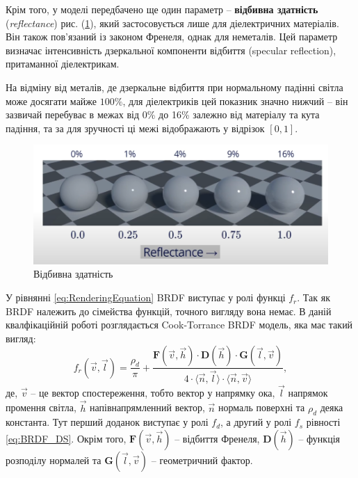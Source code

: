 Крім того, у моделі передбачено ще один параметр -- \textbf{відбивна здатність} (\textit{reflectance}) рис. (\ref{fig:Specular}), який застосовується лише для діелектричних матеріалів. 
Він також пов’язаний із законом Френеля, однак для неметалів. Цей параметр визначає інтенсивність дзеркальної компоненти відбиття (specular ref\-lec\-tion), 
притаманної діелектрикам.

На відміну від металів, де дзеркальне відбиття при нормальному падінні світла може досягати майже $100\%$, для діелектриків цей показник значно нижчий -- він 
зазвичай перебуває в межах від 0\% до 16\% залежно від матеріалу та кута падіння, та за для зручності ці межі відображають у відрізок $[0,1]$.

\begin{figure}[h]
  \centering
  \includegraphics[scale=0.75]{Pictures/Specular.png}
  \caption{Відбивна здатність}
  \label{fig:Specular}
\end{figure}

\par
У рівнянні \ref{eq:RenderingEquation} BRDF виступає у ролі функці $f_r$. Так як BRDF належить до сімейства функцій,
точного вигляду вона немає. В даній квалфікаційній роботі розглядається Cook-Torrance BRDF модель, яка має такий вигляд:
\begin{equation}
\label{eq:BRDF}
f_r(\vec{v},\vec{l}) = \frac{\rho_d}{\pi} + \frac{\mathbf{F}(\vec{v},\vec{h})\cdot\mathbf{D}(\vec{h})\cdot\mathbf{G}(\vec{l},\vec{v})}{4 \cdot\langle \vec{n}, \vec{l}\rangle \cdot\langle \vec{n}, \vec{v}\rangle},
\end{equation}
де, $\vec{v}$ -- це вектор спостереження, тобто вектор у напрямку ока, $\vec{l}$ напрямок промення світла, $\vec{h}$ напівнапрямленний вектор, $\vec{n}$ нормаль поверхні та $\rho_d$ деяка константа.
Тут перший доданок виступає у ролі $f_d$, а другий у ролі $f_s$ рівності \ref{eq:BRDF_DS}. Окрім того, $\mathbf{F}(\vec{v},\vec{h})$ -- відбиття Френеля, $\mathbf{D}(\vec{h})$ -- функція
розподілу нормалей та $\mathbf{G}(\vec{l},\vec{v})$ -- геометричний фактор.

